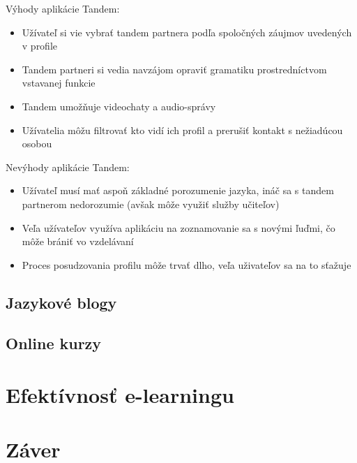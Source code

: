 \documentclass[10pt,oneside,slovak,a4paper]{article}
\begin{document}
Výhody aplikácie Tandem: 
\begin{itemize}
\item Užívateľ si vie vybrať tandem partnera podľa spoločných záujmov uvedených v profile \cite{tandem}
\item Tandem partneri si vedia navzájom opraviť gramatiku prostredníctvom vstavanej funkcie
\item Tandem umožňuje videochaty \cite{tandem} a audio-správy
\item Užívatelia môžu filtrovať kto vidí ich profil a prerušiť kontakt s nežiadúcou osobou \cite{tandem}
\end{itemize}

Nevýhody aplikácie Tandem:
\begin{itemize}
\item Užívateľ musí mať aspoň základné porozumenie jazyka, ináč sa s tandem partnerom nedorozumie (avšak môže využiť služby učiteľov) \cite{tandem}
\item Veľa užívateľov využíva aplikáciu na zoznamovanie sa s novými ľuďmi, čo môže brániť vo vzdelávaní \cite{tandem}
\item Proces posudzovania profilu môže trvať dlho, veľa uživateľov sa na to sťažuje \cite{tandem}
\end{itemize}




\subsection{Jazykové blogy}
\cite{blog}
\cite{blog-mif}
\subsection{Online kurzy}

\section{Efektívnosť e-learningu}
\cite{duolingo}
\cite{efektivnost}
\section{Záver}



\end{document}
